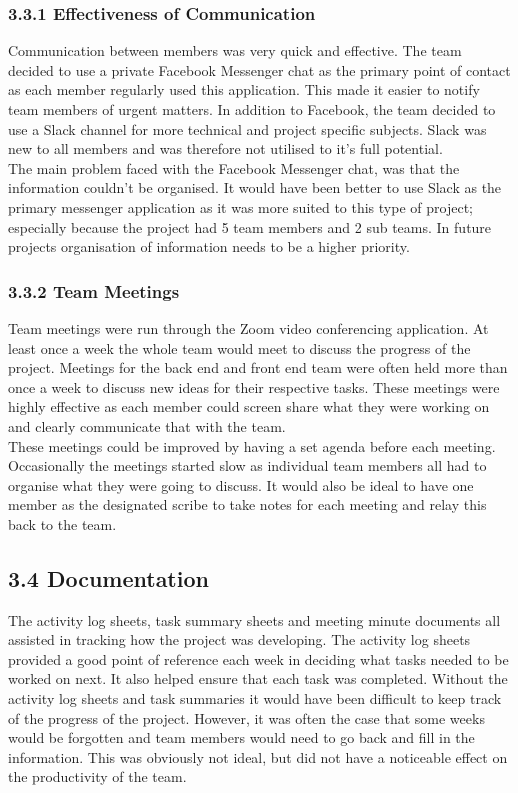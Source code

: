 \documentclass[11pt]{article}
\begin{document}
\begin{adjustwidth}{1cm}{}

\subsubsection{3.3.1 Effectiveness of Communication}
Communication between members was very quick and effective. The team decided to use a private Facebook Messenger chat as the primary point of contact as each member regularly used this application. This made it easier to notify team members of urgent matters. In addition to Facebook, the team decided to use a Slack channel for more technical and project specific subjects. Slack was new to all members and was therefore not utilised to it's full potential. \\

The main problem faced with the Facebook Messenger chat, was that the information couldn't be organised. It would have been better to use Slack as the primary messenger application as it was more suited to this type of project; especially because the project had 5 team members and 2 sub teams. In future projects organisation of information needs to be a higher priority.

\subsubsection{3.3.2 Team Meetings}
Team meetings were run through the Zoom video conferencing application. At least once a week the whole team would meet to discuss the progress of the project. Meetings for the back end and front end team were often held more than once a week to discuss new ideas for their respective tasks. These meetings were highly effective as each member could screen share what they were working on and clearly communicate that with the team. \\

These meetings could be improved by having a set agenda before each meeting. Occasionally the meetings started slow as individual team members all had to organise what they were going to discuss. It would also be ideal to have one member as the designated scribe to take notes for each meeting and relay this back to the team.

\end{adjustwidth}

\subsection{3.4 Documentation}
The activity log sheets, task summary sheets and meeting minute documents all assisted in tracking how the project was developing. The activity log sheets provided a good point of reference each week in deciding what tasks needed to be worked on next. It also helped ensure that each task was completed. Without the activity log sheets and task summaries it would have been difficult to keep track of the progress of the project. However, it was often the case that some weeks would be forgotten and team members would need to go back and fill in the information. This was obviously not ideal, but did not have a noticeable effect on the productivity of the team. \\
\end{document}
